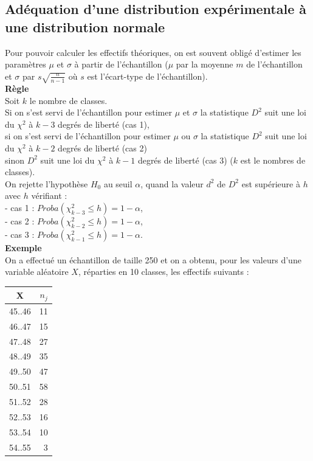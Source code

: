 \documentclass[a4paper,11pt]{book}
\begin{document}
\subsection{Ad\'equation d'une distribution exp\'erimentale \`a une distribution normale}
Pour pouvoir calculer les effectifs th\'eoriques, on est souvent oblig\'e 
d'estimer les param\`etres $\mu$ et $\sigma$ \`a partir de l'\'echantillon ($\mu$ par la moyenne $m$ de l'\'echantillon et $\sigma$ par $s\sqrt{\frac{n}{n-1}}$ o\`u $s$ est l'\'ecart-type de l'\'echantillon).\\
{\bf R\`egle}\\
Soit $k$ le nombre de classes.\\
Si on s'est servi de l'\'echantillon pour estimer $\mu$ et $\sigma$ la 
statistique $D^2$ 
suit une loi du $\chi^2$ \`a $k-3$ degr\'es de libert\'e (cas 1), \\
si on s'est servi de l'\'echantillon pour estimer $\mu$ ou $\sigma$ la 
statistique $D^2$ suit une loi du $\chi^2$ \`a $k-2$ degr\'es de libert\'e 
(cas 2)\\ 
sinon $D^2$ suit une loi du $\chi^2$ \`a $k-1$ degr\'es de libert\'e (cas 3) 
($k$ est le nombres de classes).\\ 
On rejette l'hypoth\`ese $H_0$ au seuil $\alpha$, quand la valeur $d^2$ de 
$D^2$ est sup\'erieure \`a $h$
avec $h$ v\'erifiant :\\
- cas 1 : $Proba(\chi^2_{k-3}\leq h)=1-\alpha$, \\
- cas 2 : $Proba(\chi^2_{k-2}\leq h)=1-\alpha$, \\
- cas 3 : $Proba(\chi^2_{k-1}\leq h)=1-\alpha$.\\
{\bf Exemple}\\
On a effectu\'e  un \'echantillon de taille 250 et on a obtenu, pour les
 valeurs d'une variable al\'eatoire $X$, r\'eparties en 10 classes, 
les effectifs suivants :\\
\begin{center}
\begin{tabular}{|c|r|}
\hline
X& $n_j$\\
\hline
45..46&11\\
46..47&15\\
47..48&27\\
48..49&35\\
49..50&47\\
50..51&58\\
51..52&28\\
52..53&16\\
53..54&10\\
54..55&3\\
\hline
\end{tabular}
\end{center}
\end{document}
